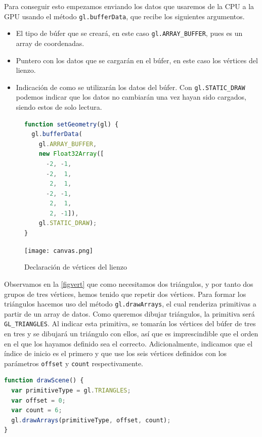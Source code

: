 Para conseguir esto empezamos enviando los datos que usaremos de la CPU a la GPU usando el método \texttt{gl.bufferData}, que recibe los siguientes argumentos.
\begin{itemize}
  \item El tipo de búfer que se creará, en este caso \texttt{gl.ARRAY\_BUFFER}, pues es un array de coordenadas.
  \item Puntero con los datos que se cargarán en el búfer, en este caso los vértices del lienzo.
  \item Indicación de como se utilizarán los datos del búfer. Con \texttt{gl.STATIC\_DRAW} podemos indicar que los datos no cambiarán una vez hayan sido cargados, siendo estos de solo lectura.
\end{itemize}
\begin{figure}[ht!]
    \centering
    \begin{minipage}{0.50\textwidth}
        \begin{lstlisting}[language=JavaScript]
function setGeometry(gl) {
  gl.bufferData(
    gl.ARRAY_BUFFER,
    new Float32Array([
      -2, -1,
      -2,  1,
       2,  1,
      -2, -1,
       2,  1,
       2, -1]),
    gl.STATIC_DRAW);
}
\end{lstlisting}
    \end{minipage}%
    \hfill
    \begin{minipage}{0.40\textwidth}
        \texttt{[image: canvas.png]}
    \end{minipage}
    \caption{Declaración de vértices del lienzo}
    \label{figvert}
\end{figure}
Observamos en la \autoref{figvert} que como necesitamos dos triángulos, y por tanto dos grupos de tres vértices, hemos tenido que repetir dos vértices. Para formar los triángulos hacemos uso del método \texttt{gl.drawArrays}, el cual renderiza primitivas a partir de un array de datos. Como queremos dibujar triángulos, la primitiva será \texttt{GL\_TRIANGLES}. Al indicar esta primitiva, se tomarán los vértices del búfer de tres en tres y se dibujará un triángulo con ellos, así que es imprescindible que el orden en el que los hayamos definido sea el correcto. Adicionalmente, indicamos que el índice de inicio es el primero y que use los seis vértices definidos con los parámetros \texttt{offset} y \texttt{count} respectivamente.
\begin{lstlisting}[language=JavaScript]
function drawScene() {
  var primitiveType = gl.TRIANGLES;
  var offset = 0;
  var count = 6;
  gl.drawArrays(primitiveType, offset, count);
}
\end{lstlisting}
